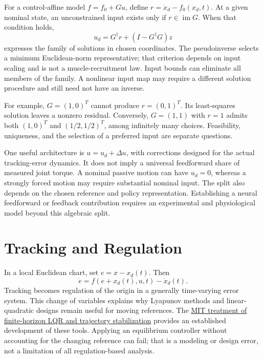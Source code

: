 For a control-affine model $f=f_0+Gu$, define
$r=\dot x_d-f_0(x_d,t)$. At a given nominal state, an unconstrained input exists
only if $r\in\operatorname{im}G$. When that condition holds,
\begin{equation}
 u_d=G^\dagger r+(I-G^\dagger G)z
 \label{eq:motion_feedforward_family}
\end{equation}
expresses the family of solutions in chosen coordinates. The pseudoinverse
selects a minimum Euclidean-norm representative; that criterion depends on
input scaling and is not a muscle-recruitment law. Input bounds can eliminate
all members of the family. A nonlinear input map may require a different
solution procedure and still need not have an inverse.

For example, $G=(1,0)^T$ cannot produce $r=(0,1)^T$. Its least-squares solution
leaves a nonzero residual. Conversely, $G=(1,1)$ with $r=1$ admits both
$(1,0)^T$ and $(1/2,1/2)^T$, among infinitely many choices. Feasibility,
uniqueness, and the selection of a preferred input are separate questions.

One useful architecture is $u=u_d+\Delta u$, with corrections designed for the
actual tracking-error dynamics. It does not imply a universal feedforward share
of measured joint torque. A nominal passive motion can have $u_d=0$, whereas
a strongly forced motion may require substantial nominal input. The split also
depends on the chosen reference and policy representation. Establishing a neural
feedforward or feedback contribution requires an experimental and physiological
model beyond this algebraic split.

\section{Tracking and Regulation}

In a local Euclidean chart, set $e=x-x_d(t)$. Then
\begin{equation}
 \dot e=f(e+x_d(t),u,t)-\dot x_d(t).
 \label{eq:motion_error_dynamics}
\end{equation}
Tracking becomes regulation of the origin in a generally time-varying error
system. This change of variables explains why Lyapunov methods and
linear-quadratic designs remain useful for moving references. The
\href{https://underactuated.mit.edu/lqr.html}{MIT treatment of finite-horizon LQR and trajectory stabilization}
provides an established development of these tools. Applying an equilibrium
controller without accounting for the changing reference can fail; that is a
modeling or design error, not a limitation of all regulation-based analysis.

